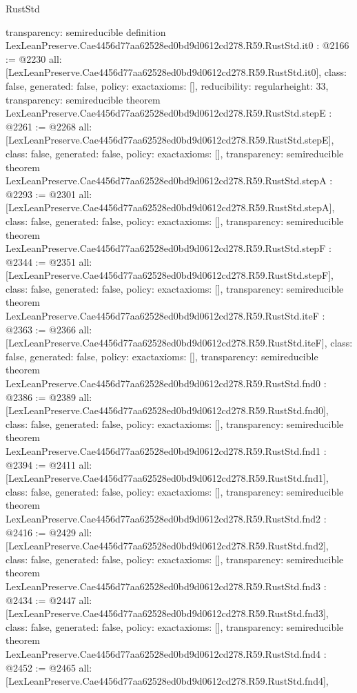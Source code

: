 \begin{lexlean}{RustStd}
\begin{coremodule}
{  transparency: semireducible
}
definition LexLeanPreserve.Cae4456d77aa62528ed0bd9d0612cd278.R59.RustStd.it0 : @2166 := @2230 {
  all: [LexLeanPreserve.Cae4456d77aa62528ed0bd9d0612cd278.R59.RustStd.it0],
  class: false,
  generated: false,
  policy: exact{axioms: []},
  reducibility: regular{height: 33},
  transparency: semireducible
}
theorem LexLeanPreserve.Cae4456d77aa62528ed0bd9d0612cd278.R59.RustStd.stepE : @2261 := @2268 {
  all: [LexLeanPreserve.Cae4456d77aa62528ed0bd9d0612cd278.R59.RustStd.stepE],
  class: false,
  generated: false,
  policy: exact{axioms: []},
  transparency: semireducible
}
theorem LexLeanPreserve.Cae4456d77aa62528ed0bd9d0612cd278.R59.RustStd.stepA : @2293 := @2301 {
  all: [LexLeanPreserve.Cae4456d77aa62528ed0bd9d0612cd278.R59.RustStd.stepA],
  class: false,
  generated: false,
  policy: exact{axioms: []},
  transparency: semireducible
}
theorem LexLeanPreserve.Cae4456d77aa62528ed0bd9d0612cd278.R59.RustStd.stepF : @2344 := @2351 {
  all: [LexLeanPreserve.Cae4456d77aa62528ed0bd9d0612cd278.R59.RustStd.stepF],
  class: false,
  generated: false,
  policy: exact{axioms: []},
  transparency: semireducible
}
theorem LexLeanPreserve.Cae4456d77aa62528ed0bd9d0612cd278.R59.RustStd.iteF : @2363 := @2366 {
  all: [LexLeanPreserve.Cae4456d77aa62528ed0bd9d0612cd278.R59.RustStd.iteF],
  class: false,
  generated: false,
  policy: exact{axioms: []},
  transparency: semireducible
}
theorem LexLeanPreserve.Cae4456d77aa62528ed0bd9d0612cd278.R59.RustStd.fnd0 : @2386 := @2389 {
  all: [LexLeanPreserve.Cae4456d77aa62528ed0bd9d0612cd278.R59.RustStd.fnd0],
  class: false,
  generated: false,
  policy: exact{axioms: []},
  transparency: semireducible
}
theorem LexLeanPreserve.Cae4456d77aa62528ed0bd9d0612cd278.R59.RustStd.fnd1 : @2394 := @2411 {
  all: [LexLeanPreserve.Cae4456d77aa62528ed0bd9d0612cd278.R59.RustStd.fnd1],
  class: false,
  generated: false,
  policy: exact{axioms: []},
  transparency: semireducible
}
theorem LexLeanPreserve.Cae4456d77aa62528ed0bd9d0612cd278.R59.RustStd.fnd2 : @2416 := @2429 {
  all: [LexLeanPreserve.Cae4456d77aa62528ed0bd9d0612cd278.R59.RustStd.fnd2],
  class: false,
  generated: false,
  policy: exact{axioms: []},
  transparency: semireducible
}
theorem LexLeanPreserve.Cae4456d77aa62528ed0bd9d0612cd278.R59.RustStd.fnd3 : @2434 := @2447 {
  all: [LexLeanPreserve.Cae4456d77aa62528ed0bd9d0612cd278.R59.RustStd.fnd3],
  class: false,
  generated: false,
  policy: exact{axioms: []},
  transparency: semireducible
}
theorem LexLeanPreserve.Cae4456d77aa62528ed0bd9d0612cd278.R59.RustStd.fnd4 : @2452 := @2465 {
  all: [LexLeanPreserve.Cae4456d77aa62528ed0bd9d0612cd278.R59.RustStd.fnd4],
}
\end{coremodule}
\end{lexlean}
